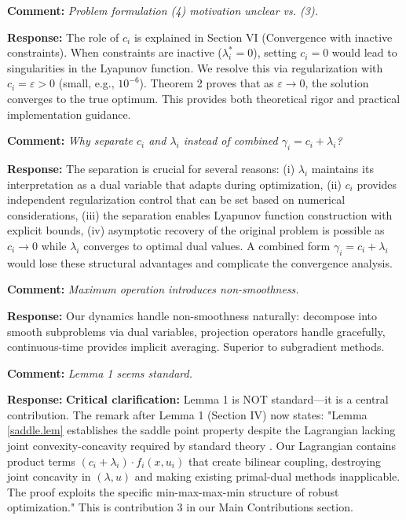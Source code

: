 \documentclass[journal,twoside,web]{ieeecolor}
\begin{document}
\textbf{Comment:} \textit{Problem formulation (4) motivation unclear vs. (3).}

\textbf{Response:} The role of $c_i$ is explained in Section VI (Convergence with inactive constraints). When constraints are inactive ($\lambda_i^* = 0$), setting $c_i = 0$ would lead to singularities in the Lyapunov function. We resolve this via regularization with $c_i = \varepsilon > 0$ (small, e.g., $10^{-6}$). Theorem 2 proves that as $\varepsilon \to 0$, the solution converges to the true optimum. This provides both theoretical rigor and practical implementation guidance.

\textbf{Comment:} \textit{Why separate $c_i$ and $\lambda_i$ instead of combined $\gamma_i = c_i + \lambda_i$?}

\textbf{Response:} The separation is crucial for several reasons: (i) $\lambda_i$ maintains its interpretation as a dual variable that adapts during optimization, (ii) $c_i$ provides independent regularization control that can be set based on numerical considerations, (iii) the separation enables Lyapunov function construction with explicit bounds, (iv) asymptotic recovery of the original problem is possible as $c_i \to 0$ while $\lambda_i$ converges to optimal dual values. A combined form $\gamma_i = c_i + \lambda_i$ would lose these structural advantages and complicate the convergence analysis.

\textbf{Comment:} \textit{Maximum operation introduces non-smoothness.}

\textbf{Response:} Our dynamics handle non-smoothness naturally: decompose into smooth subproblems via dual variables, projection operators handle gracefully, continuous-time provides implicit averaging. Superior to subgradient methods.

\textbf{Comment:} \textit{Lemma 1 seems standard.}

\textbf{Response:} \textbf{Critical clarification:} Lemma 1 is NOT standard—it is a central contribution. The remark after Lemma 1 (Section IV) now states: "Lemma \ref{saddle.lem} establishes the saddle point property despite the Lagrangian lacking joint convexity-concavity required by standard theory \cite{boyd2004,rockafellar1970}. Our Lagrangian contains product terms $(c_i+\lambda_i) \cdot f_i(x,u_i)$ that create bilinear coupling, destroying joint concavity in $(\lambda,u)$ and making existing primal-dual methods \cite{arrow1958,feijer2010} inapplicable. The proof exploits the specific min-max-max-min structure of robust optimization." This is contribution 3 in our Main Contributions section.
\end{document}
